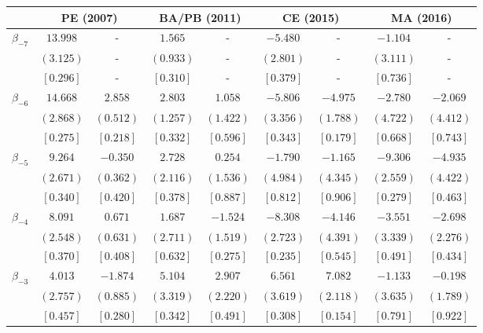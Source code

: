 \documentclass[12pt]{article}
\begin{document}
\begin{table}[h!]
\centering
\label{tab:event_study_completa}
\begin{adjustbox}{scale=0.7}
\begin{tabular}{lcccccccc}
\toprule
& \multicolumn{2}{c}{PE (2007)} & \multicolumn{2}{c}{BA/PB (2011)} & \multicolumn{2}{c}{CE (2015)} & \multicolumn{2}{c}{MA (2016)} \\
\cmidrule(lr){2-3} \cmidrule(lr){4-5} \cmidrule(lr){6-7} \cmidrule(lr){8-9}
\midrule
$\beta_{-7}$ & $ 13.998$ & - & $  1.565$ & - & $ -5.480$ & - & $ -1.104$ & - \\
& $(  3.125)$ & - & $(  0.933)$ & - & $(  2.801)$ & - & $(  3.111)$ & - \\
& $[  0.296]$ & - & $[  0.310]$ & - & $[  0.379]$ & - & $[  0.736]$ & - \\
$\beta_{-6}$ & $ 14.668$ & $  2.858$ & $  2.803$ & $  1.058$ & $ -5.806$ & $ -4.975$ & $ -2.780$ & $ -2.069$ \\
& $(  2.868)$ & $(  0.512)$ & $(  1.257)$ & $(  1.422)$ & $(  3.356)$ & $(  1.788)$ & $(  4.722)$ & $(  4.412)$ \\
& $[  0.275]$ & $[  0.218]$ & $[  0.332]$ & $[  0.596]$ & $[  0.343]$ & $[  0.179]$ & $[  0.668]$ & $[  0.743]$ \\
$\beta_{-5}$ & $  9.264$ & $ -0.350$ & $  2.728$ & $  0.254$ & $ -1.790$ & $ -1.165$ & $ -9.306$ & $ -4.935$ \\
& $(  2.671)$ & $(  0.362)$ & $(  2.116)$ & $(  1.536)$ & $(  4.984)$ & $(  4.345)$ & $(  2.559)$ & $(  4.422)$ \\
& $[  0.340]$ & $[  0.420]$ & $[  0.378]$ & $[  0.887]$ & $[  0.812]$ & $[  0.906]$ & $[  0.279]$ & $[  0.463]$ \\
$\beta_{-4}$ & $  8.091$ & $  0.671$ & $  1.687$ & $ -1.524$ & $ -8.308$ & $ -4.146$ & $ -3.551$ & $ -2.698$ \\
& $(  2.548)$ & $(  0.631)$ & $(  2.711)$ & $(  1.519)$ & $(  2.723)$ & $(  4.391)$ & $(  3.339)$ & $(  2.276)$ \\
& $[  0.370]$ & $[  0.408]$ & $[  0.632]$ & $[  0.275]$ & $[  0.235]$ & $[  0.545]$ & $[  0.491]$ & $[  0.434]$ \\
$\beta_{-3}$ & $  4.013$ & $ -1.874$ & $  5.104$ & $  2.907$ & $  6.561$ & $  7.082$ & $ -1.133$ & $ -0.198$ \\
& $(  2.757)$ & $(  0.885)$ & $(  3.319)$ & $(  2.220)$ & $(  3.619)$ & $(  2.118)$ & $(  3.635)$ & $(  1.789)$ \\
& $[  0.457]$ & $[  0.280]$ & $[  0.342]$ & $[  0.491]$ & $[  0.308]$ & $[  0.154]$ & $[  0.791]$ & $[  0.922]$ \\

\end{tabular}
\end{adjustbox}
\end{table}
\end{document}
